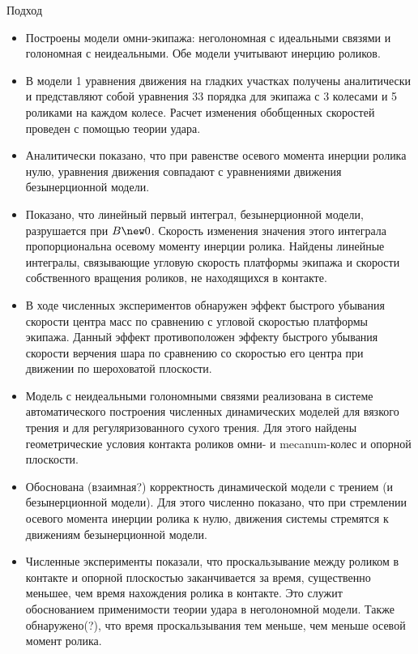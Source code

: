 \begin{frame}{Подход}
    \begin{itemize}
        \item {
            Построены модели омни-экипажа: неголономная с идеальными связями и голономная с неидеальными. Обе модели учитывают инерцию роликов.
        }
        \item {
            В модели 1 уравнения движения на гладких участках получены аналитически и представляют собой уравнения 33 порядка для экипажа с 3 колесами и 5 роликами на каждом колесе. Расчет изменения обобщенных скоростей проведен с помощью теории удара.
        }
        \item {
            Аналитически показано, что при равенстве осевого момента инерции ролика нулю, уравнения движения совпадают с уравнениями движения безынерционной модели.
        }
        \item {
            Показано, что линейный первый интеграл, безынерционной модели, разрушается при $B \new 0$. Скорость изменения значения этого интеграла пропорциональна осевому моменту инерции ролика. Найдены линейные интегралы, связывающие угловую скорость платформы экипажа и скорости собственного вращения роликов, не находящихся в контакте.
        }
        \item {
            В ходе численных экспериментов обнаружен эффект быстрого убывания скорости центра масс по сравнению с угловой скоростью платформы экипажа. Данный эффект противоположен эффекту быстрого убывания скорости верчения шара по сравнению со скоростью его центра при движении по шероховатой плоскости.
        }
        \item {
            Модель с неидеальными голономными связями реализована в системе автоматического построения численных динамических моделей для вязкого трения и для регуляризованного сухого трения. Для этого найдены геометрические условия контакта роликов омни- и mecanum-колес и опорной плоскости.
        }
        \item {
            Обоснована (взаимная?) корректность динамической модели с трением (и безынерционной модели). Для этого численно показано, что при стремлении осевого момента инерции ролика к нулю, движения системы стремятся к движениям безынерционной модели.
        }
        \item {
            Численные эксперименты показали, что проскальзывание между роликом в контакте и опорной плоскостью заканчивается за время, существенно меньшее, чем время нахождения ролика в контакте. Это служит обоснованием применимости теории удара в неголономной модели. Также обнаружено(?), что время проскальзывания тем меньше, чем меньше осевой момент ролика.
        }
    \end{itemize}
\end{frame}

